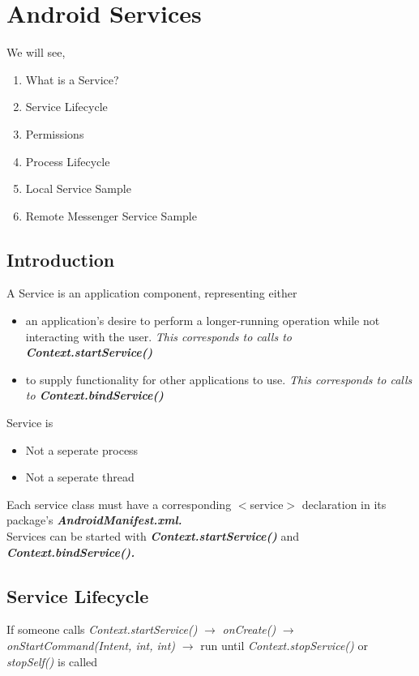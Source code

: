 \documentclass[12pt]{article}
\begin{document}
\maketitle
\pagebreak

\section{Android Services}
\label{Android Services}

We will see, 
\begin{enumerate}
\item What is a Service?
\item Service Lifecycle
\item Permissions
\item Process Lifecycle
\item Local Service Sample
\item Remote Messenger Service Sample
\end{enumerate}

\subsection{Introduction}
A Service is an application component, representing either 
\begin{itemize}
\item{an application's desire to perform a longer-running operation while not interacting with the user. \textit{This corresponds to calls to \textbf{Context.startService()}}}
\item{to supply functionality for other applications to use. \textit{This corresponds to calls to \textbf{Context.bindService()}}}
\end{itemize} 
Service is 
\begin{itemize}
\item Not a seperate process
\item Not a seperate thread
\end{itemize}
Each service class must have a corresponding $<$service$>$ declaration in its package's \textit{\textbf{AndroidManifest.xml.}} \\
Services can be started with \textbf{\textit{Context.startService()}} and \textbf{\textit{Context.bindService().}}\\


\subsection{Service Lifecycle}
 If someone calls \textit{Context.startService()} $\longrightarrow$ \textit{onCreate()} $\longrightarrow$ \\ \textit{onStartCommand(Intent, int, int) } $\longrightarrow$  run until \textit{Context.stopService()} or \textit{stopSelf()} is called
\end{document}
